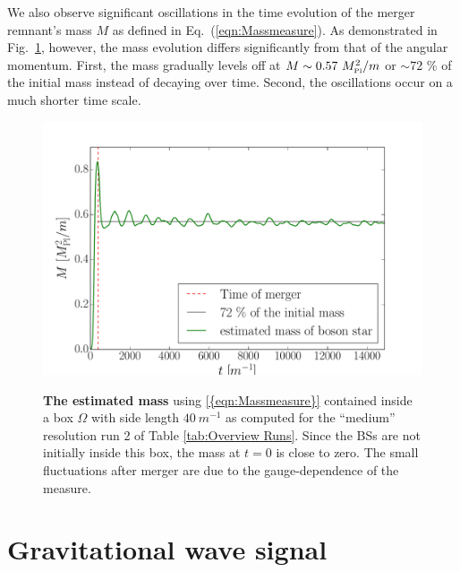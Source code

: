 \documentclass[aps,twocolumn,nofootinbib,superscriptaddress,amsfonts,floatfix
]{revtex4-1} %
\newcommand{\mpl}{M_{\mbox{\tiny Pl}}}
\begin{document}
We also observe significant oscillations in the time evolution
of the merger remnant's mass $M$ as defined in Eq.~(\ref{eqn:Massmeasure}). As demonstrated in
Fig.~\ref{fig:energy}, however, the mass evolution differs
significantly from that of the angular momentum.
First, the mass gradually levels off
at $M \sim 0.57~\mpl^2/m$ or $\sim 72$ \% of the initial mass instead of decaying over time.
Second, the oscillations occur on a much shorter time scale.

\begin{figure}[t]
\begin{center}
    {\includegraphics[width=1.0\columnwidth]{mass_over_time.pdf}}
    \caption{{\bf The estimated mass} using \cref{{eqn:Massmeasure}}
    contained inside a box $\Omega$ with side length $40~m^{-1}$ as computed for the ``medium'' 
    resolution run 2 of Table \ref{tab:Overview Runs}. 
    Since the BSs are
    not initially inside this box, the mass at $t = 0$ is close to zero. The small fluctuations after merger
   are due to the gauge-dependence of the measure.
   }
\label{fig:energy}
\end{center}
\end{figure}

\section{Gravitational wave signal}\label{sec:GWs}
\end{document}
